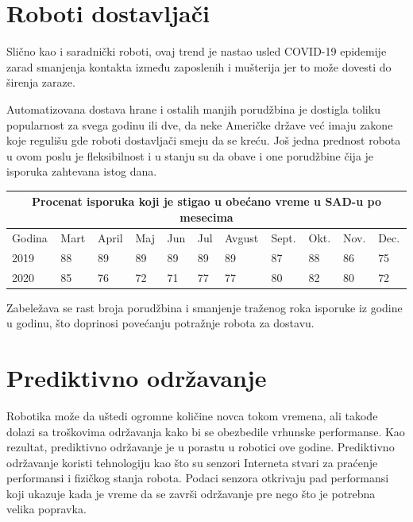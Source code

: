 \documentclass{article}
\begin{document}
	\section{Roboti dostavljači}
	Slično kao i saradnički roboti, ovaj trend je nastao usled COVID-19 epidemije zarad smanjenja kontakta između zaposlenih i mušterija jer to može dovesti do širenja zaraze.
	
	Automatizovana dostava hrane i ostalih manjih porudžbina je dostigla toliku popularnost za svega godinu ili dve, da neke Američke države već imaju zakone koje regulišu gde roboti dostavljači smeju da se kreću. Još jedna prednost robota u ovom poslu je fleksibilnost i u stanju su da obave i one porudžbine čija je isporuka zahtevana istog dana.
	\vspace{0.25cm}
	\begin{center}
		\begin{tabular}{ |p{1cm}|p{1cm}|p{1cm}|p{1cm} |p{1cm}|p{1cm}|p{1cm}|p{1cm}|p{1cm}|p{1cm}|p{1cm}|}
			\hline
			\multicolumn{11}{|c|}{Procenat isporuka koji je stigao u obećano vreme u SAD-u po mesecima} \\
			\hline
			Godina & Mart & April & Maj & Jun & Jul & Avgust & Sept. & Okt. & Nov. & Dec. \\
			\hline
			2019 & 88 & 89 & 89 & 89 & 89 & 89 & 87 & 88 & 86 & 75 \\
			2020 & 85 & 76 & 72 & 71 & 77 & 77 & 80 & 82 & 80 & 72 \\
			\hline
		\end{tabular}
	\end{center}
	\vspace{0.25cm}
	Zabeležava se rast broja porudžbina i smanjenje traženog roka isporuke iz godine u godinu, što doprinosi povećanju potražnje robota za dostavu. \cite{robotics2022, sameday}  
	
	\section{Prediktivno održavanje}
	Robotika može da uštedi ogromne količine novca tokom vremena, ali takođe dolazi sa troškovima održavanja kako bi se obezbedile vrhunske performanse. Kao rezultat, prediktivno održavanje je u porastu u robotici ove godine. Prediktivno održavanje koristi tehnologiju kao što su senzori Interneta stvari za praćenje performansi i fizičkog stanja robota. Podaci senzora otkrivaju pad performansi koji ukazuje kada je vreme da se završi održavanje pre nego što je potrebna velika popravka.
	
\end{document}
